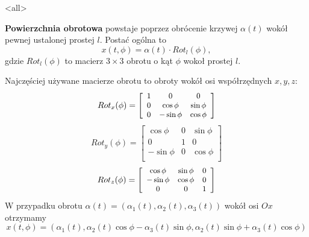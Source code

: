 \mode<all>{}
\begin{frame}[<+->]

\begin{definicja}
\textbf{Powierzchnia obrotowa} powstaje poprzez obrócenie krzywej $\alpha(t)$ 
wokół pewnej ustalonej prostej $l$. Postać ogólna to 
\[x(t,\phi)=\alpha(t)\cdot Rot_l(\phi),\] 
gdzie $Rot_l(\phi)$ to macierz $3\times 3$ obrotu o kąt $\phi$ wokoł prostej 
$l$.
\begin{center}

\end{center}
\end{definicja}
\end{frame}
\begin{frame}
Najczęściej używane macierze obrotu to obroty wok\'oł osi wsp\'ołrzędnych $x,y,z$:
\[\small Rot_{x}(\phi)=\left[\begin{array}{ccc}
1 & 0 & 0\\
0 & \cos\phi & \sin\phi\\
0 & -\sin\phi & \cos\phi\\
\end{array}\right]\]
\[
Rot_{y}(\phi)=\left[\begin{array}{ccc}
\cos\phi & 0 & \sin\phi\\
0 & 1 & 0\\
-\sin\phi & 0 & \cos\phi\\
\end{array}\right]\]
\[\small Rot_{z}(\phi)=\left[\begin{array}{ccc}
\cos\phi & \sin\phi & 0 \\
-\sin\phi & \cos\phi & 0\\
0 & 0 & 1\\
\end{array}\right]\]
\pause W przypadku obrotu $\alpha (t)=(\alpha_1(t),\alpha_2(t),\alpha_3(t))$ wok\'oł osi $Ox$ otrzymamy
\[x(t,\phi)=\left(\alpha_1(t),\alpha_2(t)\cos\phi-\alpha_3(t)\sin\phi,\alpha_2 (t)\sin\phi+\alpha_3 (t)\cos\phi\right)\]

\end{frame}



